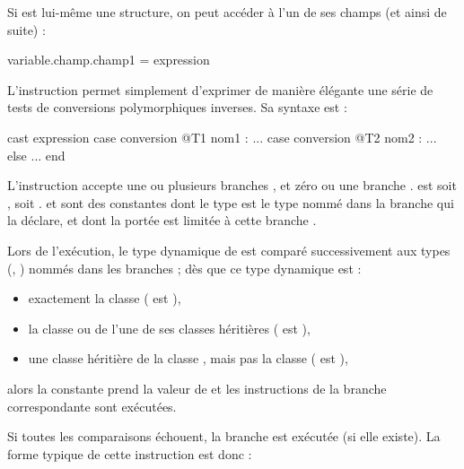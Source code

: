 Si  est lui-même une structure, on peut accéder à l'un de ses champs (et ainsi de suite) :
\begin{galgascode}
variable.champ.champ1 = expression
\end{galgascode}














L'instruction  permet simplement d'exprimer de manière élégante une série de tests de conversions polymorphiques inverses. Sa syntaxe est :

\begin{galgascode}
cast expression
case conversion @T1 nom1 :
  ...
case conversion @T2 nom2 :
  ...
else
  ...
end
\end{galgascode}

L'instruction accepte une ou plusieurs branches , et zéro ou une branche .  est soit \galgas{==}, soit \galgas{>=}.  et  sont des constantes dont le type est le type nommé dans la branche  qui la déclare, et dont la portée est limitée à cette branche .

Lors de l'exécution, le type dynamique de  est comparé successivement aux types (, ) nommés dans les branches  ; dès que ce type dynamique est :
\begin{itemize}
  \item exactement la classe  ( est \galgas{==}), 
  \item la classe  ou de l'une de ses classes héritières ( est \galgas{>=}),
  \item une classe héritière de la classe , mais pas la classe  ( est \galgas{>}),
\end{itemize}
alors la constante prend la valeur de  et les instructions de la branche correspondante sont exécutées.

Si toutes les comparaisons échouent, la branche  est exécutée (si elle existe). La forme typique de cette instruction est donc :


